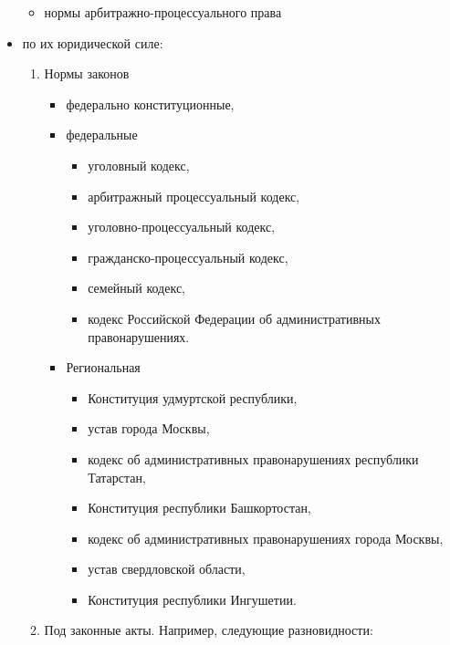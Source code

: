 \begin{itemize}
\begin{itemize}
		      \item нормы арбитражно-процессуального права
	      \end{itemize}
	\item по их юридической силе:
	      \begin{enumerate}
		      \item Нормы законов
		            \begin{itemize}
			            \item федерально конституционные,
			            \item федеральные
			                  \begin{itemize}
				                  \item уголовный кодекс,
				                  \item арбитражный процессуальный кодекс,
				                  \item уголовно-процессуальный кодекс,
				                  \item гражданско-процессуальный кодекс,
				                  \item семейный кодекс,
				                  \item кодекс Российской Федерации об административных
				                        правонарушениях.
			                  \end{itemize}
			            \item Региональная
			                  \begin{itemize}
				                  \item Конституция удмуртской республики,
				                  \item устав города Москвы,
				                  \item кодекс об административных правонарушениях
				                        республики Татарстан,
				                  \item Конституция республики Башкортостан,
				                  \item кодекс об административных правонарушениях города Москвы,
				                  \item устав свердловской области,
				                  \item Конституция республики Ингушетии.
			                  \end{itemize}
		            \end{itemize}
		      \item Под законные акты. Например, следующие разновидности:
		            \begin{itemize}

\end{itemize}
\end{enumerate}
\end{itemize}
